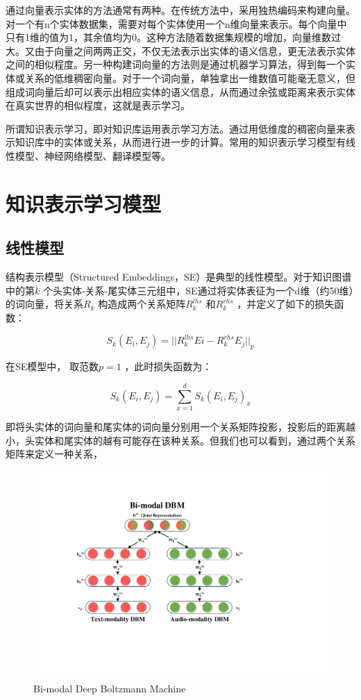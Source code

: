 \documentclass{llncs}
\begin{document}
通过向量表示实体的方法通常有两种。在传统方法中，采用独热编码来构建向量。对一个有n个实体数据集，需要对每个实体使用一个n维向量来表示。每个向量中只有1维的值为1，其余值均为0。这种方法随着数据集规模的增加，向量维数过大。又由于向量之间两两正交，不仅无法表示出实体的语义信息，更无法表示实体之间的相似程度。另一种构建词向量的方法则是通过机器学习算法，得到每一个实体或关系的低维稠密向量。对于一个词向量，单独拿出一维数值可能毫无意义，但组成词向量后却可以表示出相应实体的语义信息，从而通过余弦或距离来表示实体在真实世界的相似程度，这就是表示学习。

所谓知识表示学习，即对知识库运用表示学习方法。通过用低维度的稠密向量来表示知识库中的实体或关系，从而进行进一步的计算。常用的知识表示学习模型有线性模型、神经网络模型、翻译模型等。

\section{知识表示学习模型}

\subsection{线性模型}

结构表示模型（Structured Embeddings，SE）\cite{DBLP:conf/aaai/BordesWCB11}是典型的线性模型。对于知识图谱中的第$k$ 个头实体-关系-尾实体三元组中，SE通过将实体表征为一个d维（约50维）的词向量，将关系$R_k$ 构造成两个关系矩阵$R^{lhs}_k$ 和$R^{rhs}_k$ ，并定义了如下的损失函数：

\begin{displaymath}
S_k(E_i,E_j)=||R^{lhs}_kEi-R^{rhs}_kE_j||_p
\end{displaymath}

在SE模型中，	取范数$p=1$ ，此时损失函数为：

\begin{displaymath}
S_k(E_i,E_j)=\sum_{x=1}^d{S_k(E_i,E_j)_x}
\end{displaymath}

即将头实体的词向量和尾实体的词向量分别用一个关系矩阵投影，投影后的距离越小，头实体和尾实体的越有可能存在该种关系。但我们也可以看到，通过两个关系矩阵来定义一种关系，

\begin{figure}
	\centering
	\includegraphics[width=0.5\columnwidth]{figures/bi-modalDBM}
	\caption{Bi-modal Deep Boltzmann Machine}
	\label{fg:DBM}
\end{figure}
\end{document}

